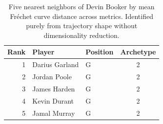 \begin{table}[htbp]
  \centering\small
  \begin{tabular}{rllc}
    \toprule
    Rank & Player & Position & Archetype \\
    \midrule
    1 & Darius Garland & G & 2 \\
    2 & Jordan Poole & G & 2 \\
    3 & James Harden & G & 2 \\
    4 & Kevin Durant & G & 2 \\
    5 & Jamal Murray & G & 2 \\
    \bottomrule
  \end{tabular}
  \caption{Five nearest neighbors of Devin Booker by mean Fr\'{e}chet curve distance across metrics. Identified purely from trajectory shape without dimensionality reduction.}
  \label{tab:Devin_Booker_frechet_curve_neighbors}
\end{table}

